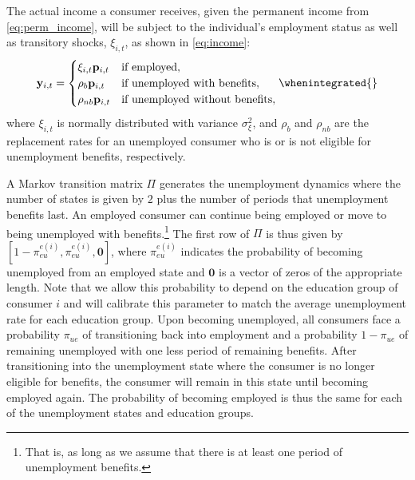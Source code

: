 \documentclass[\latexroot/\projectname]{subfiles}
\begin{document}
The actual income a consumer receives, given the permanent income from \eqref{eq:perm_income}, will be subject to the individual's employment status as well as transitory shocks, $\xi_{i,t}$, as shown in \eqref{eq:income}:
\begin{equation}
  \begin{gathered}
    \begin{aligned}
      \mathbf{y}_{i,t} =   \begin{cases}
                             \xi_{i,t}\mathbf{p}_{i,t}  & \text{if employed},                    \\
                             \rho_b \mathbf{p}_{i,t}    & \text{if unemployed with benefits},    \\
                             \rho_{nb} \mathbf{p}_{i,t} & \text{if unemployed without benefits},
                           \end{cases}
      \whenintegrated{\label{eq:income}} %
    \end{aligned}
  \end{gathered}
\end{equation}
where $\xi_{i,t}$ is normally distributed with variance $\sigma_{\xi}^2$, and $\rho_b$ and $\rho_{nb}$ are the replacement rates for an unemployed consumer who is or is not eligible for unemployment benefits, respectively.

A Markov transition matrix $\Pi$ generates the unemployment dynamics where the number of states is given by $2$ plus the number of periods that unemployment benefits last.
An employed consumer can continue being employed or move to being unemployed with benefits.\footnote{That is, as long as we assume that there is at least one period of unemployment benefits.} The first row of $\Pi$ is thus given by $[1-\pi_{eu}^{e(i)}, \pi_{eu}^{e(i)}, \mathbf{0}]$, where $\pi_{eu}^{e(i)}$ indicates the probability of becoming unemployed from an employed state and $\mathbf{0}$ is a vector of zeros of the appropriate length.
Note that we allow this probability to depend on the education group of consumer $i$ and will calibrate this parameter to match the average unemployment rate for each education group.
Upon becoming unemployed, all consumers face a probability $\pi_{ue}$ of transitioning back into employment and a probability $1-\pi_{ue}$ of remaining unemployed with one less period of remaining benefits.
After transitioning into the unemployment state where the consumer is no longer eligible for benefits, the consumer will remain in this state until becoming employed again.
The probability of becoming employed is thus the same for each of the unemployment states and education groups.
\end{document}
